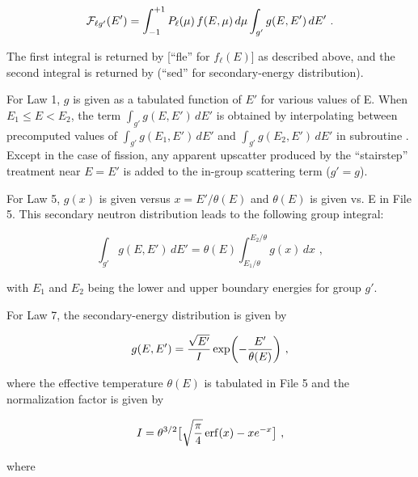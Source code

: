   \begin{equation}
    {\cal F}_{\ell g'}(E') = \int_{-1}^{+1} P_{\ell}(\mu) \,f(E,\mu)\,d\mu
    \int_{g'} g(E,E')\,dE'\,\,.
  \end{equation}
\vspace{0.5 pt}

\noindent
The first integral is returned by  [``fle'' for $f_\ell (E)$]
as described above, and the second integral is returned by 
(``sed'' for secondary-energy distribution).

For Law 1, $g$ is given as a tabulated function of $E'$ for various
values of E.  When $E_1\leq E<E_2$, the term $\int_{g'} g(E,E')\,dE'$ is
obtained by interpolating between precomputed values of
$\int_{g'} g(E_1,E')\,dE'$ and $\int_{g'} g(E_2,E')\,dE'$ in subroutine
.  Except in the case of fission, any apparent upscatter
produced by the ``stairstep'' treatment near $E{=}E'$ is added to the
in-group scattering term ($g'{=}g$).

For Law 5, $g(x)$ is given versus $x=E'/\theta(E)$ and $\theta(E)$
is given vs. E in File 5.  This secondary neutron distribution leads to
the following group integral:

  \begin{equation}
    \int_{g'}g(E,E')\,dE'=\theta(E)
    \int_{E_1/\theta}^{E_2/\theta}g(x)\,dx\,\,,
  \end{equation}
\vspace{0.5 pt}

\noindent
with $E_1$ and $E_2$ being the lower and upper boundary energies
for group $g'$.

For Law 7, the secondary-energy distribution is given by

  \begin{equation}
    g(E,E')={{\sqrt{E'}}\over I} \exp \biggl( {-{{E'}
    \over{\theta(E)}}} \biggr) \,\,,
  \label{Eq86}
  \end{equation}
\vspace{0.5 pt}

\noindent
where the effective temperature $\theta(E)$ is tabulated in File 5
and the normalization factor is given by

  \begin{equation}
    I=\theta^{3/2} \bigl[ {\sqrt{\pi \over 4}}
    {\,\rm erf}(x) - x e^{-x} \bigr]\,\,,
  \end{equation}
\vspace{0.5 pt}

\noindent
where

